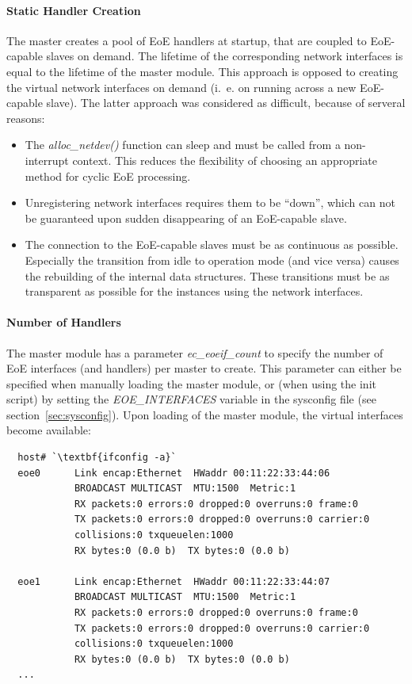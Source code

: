\documentclass[a4paper,12pt,BCOR6mm,bibtotoc,idxtotoc]{scrbook}
\begin{document}
\paragraph{Static Handler Creation}

The master creates a pool of EoE handlers at startup, that are coupled
to EoE-capable slaves on demand. The lifetime of the corresponding
network interfaces is equal to the lifetime of the master module.
This approach is opposed to creating the virtual network interfaces on
demand (i.~e. on running across a new EoE-capable slave). The latter
approach was considered as difficult, because of serveral reasons:

\begin{itemize}
\item The \textit{alloc\_netdev()} function can sleep and must be
  called from a non-interrupt context. This reduces the flexibility of
  choosing an appropriate method for cyclic EoE processing.
\item Unregistering network interfaces requires them to be ``down'',
  which can not be guaranteed upon sudden disappearing of an
  EoE-capable slave.
\item The connection to the EoE-capable slaves must be as continuous
  as possible. Especially the transition from idle to operation mode
  (and vice versa) causes the rebuilding of the internal data
  structures. These transitions must be as transparent as possible for
  the instances using the network interfaces.
\end{itemize}

\paragraph{Number of Handlers}

The master module has a parameter \textit{ec\_eoeif\_count} to specify
the number of EoE interfaces (and handlers) per master to create. This
parameter can either be specified when manually loading the master
module, or (when using the init script) by setting the
\textit{EOE\_INTERFACES} variable in the sysconfig file (see
section~\ref{sec:sysconfig}). Upon loading of the master module, the
virtual interfaces become available:

\begin{lstlisting}
  host# `\textbf{ifconfig -a}`
  eoe0      Link encap:Ethernet  HWaddr 00:11:22:33:44:06
            BROADCAST MULTICAST  MTU:1500  Metric:1
            RX packets:0 errors:0 dropped:0 overruns:0 frame:0
            TX packets:0 errors:0 dropped:0 overruns:0 carrier:0
            collisions:0 txqueuelen:1000
            RX bytes:0 (0.0 b)  TX bytes:0 (0.0 b)

  eoe1      Link encap:Ethernet  HWaddr 00:11:22:33:44:07
            BROADCAST MULTICAST  MTU:1500  Metric:1
            RX packets:0 errors:0 dropped:0 overruns:0 frame:0
            TX packets:0 errors:0 dropped:0 overruns:0 carrier:0
            collisions:0 txqueuelen:1000
            RX bytes:0 (0.0 b)  TX bytes:0 (0.0 b)
  ...
\end{lstlisting}
\end{document}
